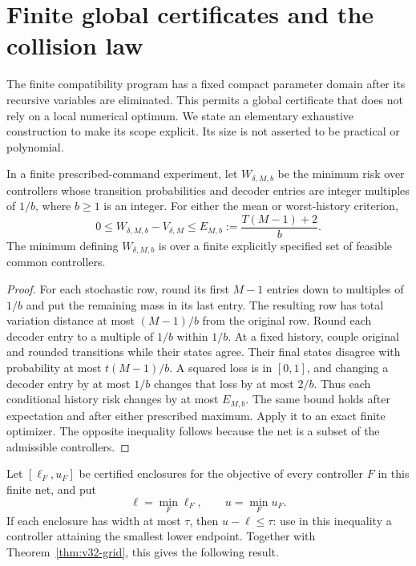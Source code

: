 \section{Finite global certificates and the collision law}
\label{sec:v32-certificates}

The finite compatibility program has a fixed compact parameter domain
after its recursive variables are eliminated. This permits a global
certificate that does not rely on a local numerical optimum. We state
an elementary exhaustive construction to make its scope explicit.
Its size is not asserted to be practical or polynomial.

\begin{lemma}\label{lem:v32-controller-net}
In a finite prescribed-command experiment, let $W_{\delta,M,b}$ be the
minimum risk over controllers whose transition probabilities and decoder
entries are integer multiples of $1/b$, where $b\ge1$ is an integer. For either the
mean or worst-history criterion,
\begin{equation}\label{eq:v32-controller-net}
 0\le W_{\delta,M,b}-V_{\delta,M}
       \le E_{M,b}:=\frac{T(M-1)+2}{b}.
\end{equation}
The minimum defining $W_{\delta,M,b}$ is over a finite explicitly
specified set of feasible common controllers.
\end{lemma}
\begin{proof}
For each stochastic row, round its first $M-1$ entries down to multiples
of $1/b$ and put the remaining mass in its last entry. The resulting row
has total variation distance at most $(M-1)/b$ from the original row.
Round each decoder entry to a multiple of $1/b$ within $1/b$.
At a fixed history, couple original and rounded transitions while their
states agree. Their final states disagree with probability at most
$t(M-1)/b$. A squared loss is in $[0,1]$, and changing a decoder entry
by at most $1/b$ changes that loss by at most $2/b$. Thus each conditional
history risk changes by at most $E_{M,b}$. The same bound holds after
expectation and after either prescribed maximum. Apply it to an exact
finite optimizer. The opposite inequality follows because the net is a
subset of the admissible controllers.
\end{proof}

Let $[\ell_F,u_F]$ be certified enclosures for the objective of every
controller $F$ in this finite net, and put
\[
 \ell=\min_F\ell_F,\qquad u=\min_Fu_F.
\]
If each enclosure has width at most $\tau$, then $u-\ell\le\tau$:
use in this inequality a controller attaining the smallest lower endpoint.
Together with Theorem~\ref{thm:v32-grid}, this gives the following result.

